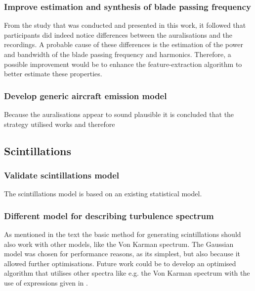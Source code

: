 
\subsubsection*{Improve estimation and synthesis of blade passing frequency}
From the study that was conducted and presented in this work, it followed that
participants did indeed notice differences between the auralisations and the
recordings. A probable cause of these differences is the estimation of the
power and bandwidth of the blade passing frequency and harmonics. Therefore, a
possible improvement would be to enhance the feature-extraction algorithm to
better estimate these properties.


\subsubsection*{Develop generic aircraft emission model}
Because the auralisations appear to sound plausible it is concluded that the strategy
utilised works and therefore


\subsection{Scintillations}

\subsubsection*{Validate scintillations model}
The scintillations model is based on an existing statistical model.

\subsubsection*{Different model for describing turbulence spectrum}
As mentioned in the text the basic method for generating scintillations should
also work with other models, like the Von Karman spectrum. The Gaussian model
was chosen for performance reasons, as its simplest, but also because it allowed
further optimisations. Future work could be to develop an optimised algorithm
that utilises other spectra like e.g. the Von Karman spectrum with the use of
expressions given in \cite{Ostashev2015}.

